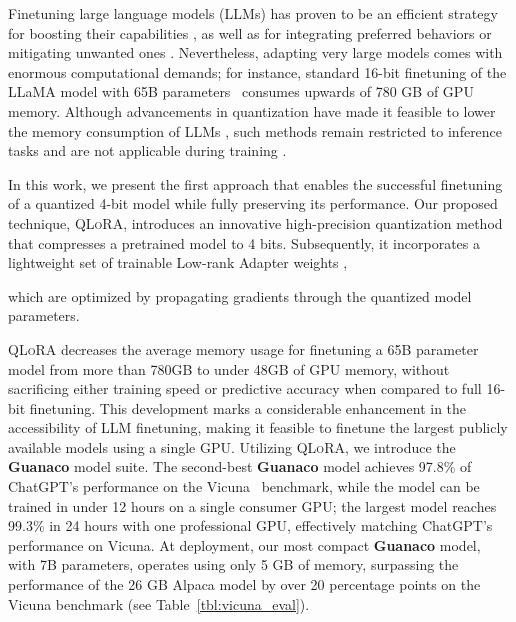 Finetuning large language models (LLMs) has proven to be an efficient strategy for boosting their capabilities \citep{min2021metaicl, wei2021finetuned, ouyang2022training, wang2022super, wang2022self, liu2022few}, as well as for integrating preferred behaviors or mitigating unwanted ones \citep{ouyang2022training,askell2021general,bai2022training}. Nevertheless, adapting very large models comes with enormous computational demands; for instance, standard 16-bit finetuning of the LLaMA model with 65B parameters~\citep{touvron2023llama} consumes upwards of 780 GB of GPU memory. Although advancements in quantization have made it feasible to lower the memory consumption of LLMs \citep{dettmers2022llm, dettmers2022case, frantar2022gptq, xiao2022smoothquant}, such methods remain restricted to inference tasks and are not applicable during training \citep{wortsman2023stable}. 

In this work, we present the first approach that enables the successful finetuning of a quantized 4-bit model while fully preserving its performance. Our proposed technique, \textsc{QLoRA}, introduces an innovative high-precision quantization method that compresses a pretrained model to 4 bits. Subsequently, it incorporates a lightweight set of trainable Low-rank Adapter weights \citep{hu2021lora}, 

which are optimized by propagating gradients through the quantized model parameters. 

\textsc{QLoRA} decreases the average memory usage for finetuning a 65B parameter model from more than 780GB to under 48GB of GPU memory, without sacrificing either training speed or predictive accuracy when compared to full 16-bit finetuning. This development marks a considerable enhancement in the accessibility of LLM finetuning, making it feasible to finetune the largest publicly available models using a single GPU. Utilizing \textsc{QLoRA}, we introduce the \textbf{Guanaco} model suite. The second-best \textbf{Guanaco} model achieves 97.8\% of ChatGPT's performance on the Vicuna~\citep{vicuna2023} benchmark, while the model can be trained in under 12 hours on a single consumer GPU; the largest model reaches 99.3\% in 24 hours with one professional GPU, effectively matching ChatGPT's performance on Vicuna. At deployment, our most compact \textbf{Guanaco} model, with 7B parameters, operates using only 5 GB of memory, surpassing the performance of the 26 GB Alpaca model by over 20 percentage points on the Vicuna benchmark (see Table~\ref{tbl:vicuna_eval}).

